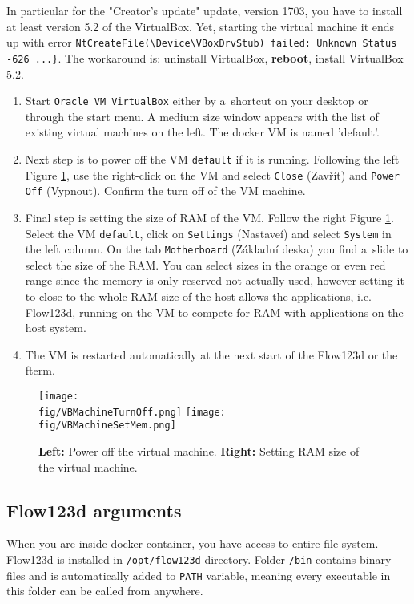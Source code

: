 \documentclass[12pt,a4paper]{report}
\def\fig{figures}
\begin{document}
In particular for the "Creator's update" update, version 1703, you have to install at least version 5.2 
of the VirtualBox. Yet, starting the virtual machine it ends up with error \verb'NtCreateFile(\Device\VBoxDrvStub) failed: Unknown Status -626 ...}'. The workaround is:
uninstall VirtualBox, {\bf reboot}, install VirtualBox 5.2.  

 
\begin{enumerate}
 \item Start \verb'Oracle VM VirtualBox' either by a~shortcut on your desktop or through the start menu. 
 A medium size window appears with the list of existing virtual machines 
 on the left. The docker VM is named 'default'.
 \item Next step is to power off the VM \verb'default' if it is running. 
 Following the left Figure \ref{fig:vm_ram_setup}, use the right-click on the VM and select \verb'Close' (Zav\v r\' it) and 
 \verb'Power Off' (Vypnout). Confirm the turn off of the VM machine. 
 \item Final step is setting the size of RAM of the VM. Follow the right Figure \ref{fig:vm_ram_setup}. 
 Select the VM \verb'default', click on \verb'Settings' (Nastave\' i) and select \verb'System' in the left column.
 On the tab \verb'Motherboard' (Z\' akladn\' i deska) you find a~slide to select the size of the RAM. You can select sizes  
 in the orange or even red range since the memory is only reserved not actually used, however setting it to close to the 
 whole RAM size of the host allows the applications, i.e. Flow123d, running on the VM to compete for RAM with applications on the host system.
 \item The VM is restarted automatically at the next start of the Flow123d or the fterm.
\end{enumerate}


\begin{figure}
    \center  
    \texttt{[image: \\fig/VBMachineTurnOff.png]}
    \hspace{2ex}
    \texttt{[image: \\fig/VBMachineSetMem.png]}
    \caption{{\bf Left:} Power off the virtual machine.
             {\bf Right:} Setting RAM size of the virtual machine.} 
    \label{fig:vm_ram_setup}
\end{figure}

\subsection{Flow123d arguments}
When you are inside docker container, you have access to entire file system. Flow123d is installed in 
\verb'/opt/flow123d' directory. Folder \verb'/bin' contains binary files and is automatically 
added to \verb'PATH' variable, meaning every executable in this folder can be called from anywhere.
\end{document}
